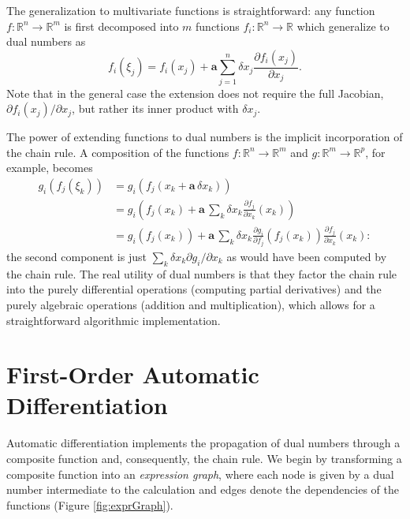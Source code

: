 \documentclass[11pt]{article}
\begin{document}
The generalization to multivariate functions is straightforward: any function 
$f : \mathbb{R}^{n} \rightarrow \mathbb{R}^{m}$ is first decomposed into $m$
functions $f_{i} : \mathbb{R}^{n} \rightarrow \mathbb{R}$ which generalize
to dual numbers as
%
\begin{equation} \label{dualFunction}
f_{i} \! \left( \xi_{j} \right) = f_{i} \! \left( x_{j} \right) 
+ \mathbf{a} \sum_{j = 1}^{n} \delta x_{j} \frac{ \partial f_{i} \! \left( x_{j} \right) }{ \partial x_{j} }.
\end{equation}
%
Note that in the general case the extension does not require the full Jacobian, 
$ \partial f_{i} \! \left( x_{j} \right) \! / \partial x_{j}$, but rather its inner product with 
$\delta x_{j}$.

The power of extending functions to dual numbers is the implicit incorporation of 
the chain rule. A composition of the functions $f : \mathbb{R}^{n} \rightarrow \mathbb{R}^{m}$ 
and $g : \mathbb{R}^{m} \rightarrow \mathbb{R}^{p}$, for example, becomes
%
\begin{align*}
g_{i} \! \left( f_{j} \! \left( \xi_{k} \right) \right)
&= 
g_{i} \! \left( f_{j} \! \left( x_{k} + \mathbf{a} \, \delta x_{k} \right) \right)
\\
&=
g_{i} \! \left( f_{j} \! \left( x_{k} \right) 
+ \mathbf{a} \, \sum_{k} \delta x_{k} \frac{ \partial f_{j} }{ \partial x_{k} } \! \left( x_{k} \right) \right)
\\
&=
g_{i} \! \left( f_{j} \! \left( x_{k} \right) \right)
+ \mathbf{a} \, \sum_{k} \delta x_{k} 
\frac{ \partial g_{i} }{ \partial f_{j} }  \! \left( f_{j} \! \left( x_{k} \right) \right)
\frac{ \partial f_{j} }{ \partial x_{k} } \! \left( x_{k} \right):
\end{align*}
%
the second component is just $\sum_{k} \delta x_{k} \partial g_{i} / \partial x_{k} $ 
as would have been computed by the chain rule.  The real utility of dual numbers is 
that they factor the chain rule into the purely differential operations (computing partial
derivatives) and the purely algebraic operations (addition and multiplication), which 
allows for a straightforward algorithmic implementation.

\section*{First-Order Automatic Differentiation}

Automatic differentiation implements the propagation of dual numbers through a
composite function and, consequently, the chain rule.  We begin by transforming
a composite function into an \textit{expression graph}, where each node is given
by a dual number intermediate to the calculation and edges denote the 
dependencies of the functions (Figure \ref{fig:exprGraph}).
\end{document}
